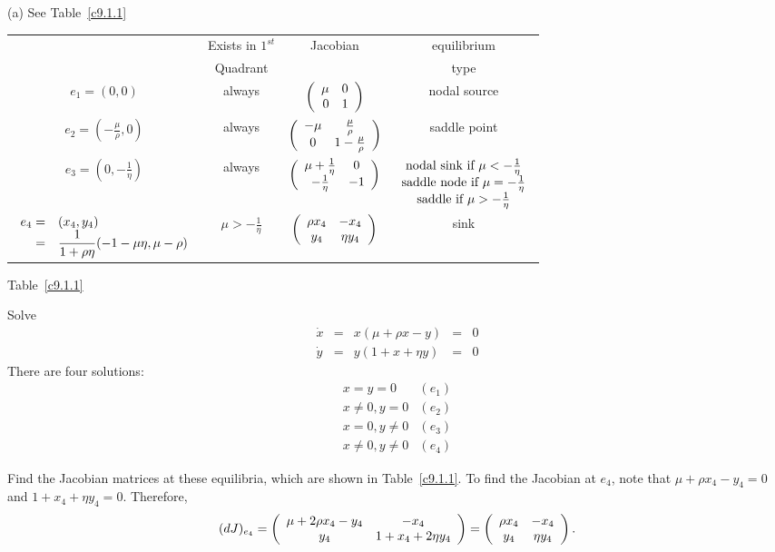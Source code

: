 \documentclass{ximera}
\begin{document}
(a) \ans See Table~\ref{c9.1.1}
\begin{table}[htb]
\begin{center}
\begin{tabular}{|c|c|c|c|}
\hline
& Exists in $1^{st}$ & Jacobian & equilibrium \\
& Quadrant & & type \\
\hline
$e_1 = (0,0)$ & always & $\left(\begin{array}{rr} \mu & 0\\ 0 &1\end{array}\right)$ & nodal source \\
\hline
$e_2 = \left(-\frac{\mu}{\rho},0\right)$ & always &
$\left(\begin{array}{cc} -\mu & \frac{\mu}{\rho}\\ 0 &1 - \frac{\mu}{\rho}\end{array}\right)$ &
saddle point \\
\hline
$e_3 = \left(0,-\frac{1}{\eta}\right)$ & always &
$\left(\begin{array}{cc} \mu + \frac{1}{\eta} & 0\\ -\frac{1}{\eta} &-1\end{array}\right)$ &
$\begin{array}{c} \hbox{nodal sink if } \mu < -\frac{1}{\eta} \\
\hbox{saddle node if } \mu = -\frac{1}{\eta} \\
\hbox{saddle if } \mu > -\frac{1}{\eta} \end{array}$ \\
\hline
$\begin{array}{rl} e_4 = & (x_4,y_4) \\
 = & \displaystyle\frac{1}{1 + \rho\eta}(-1 - \mu\eta, \mu - \rho) \end{array}$ 
& $\mu > -\frac{1}{\eta}$ &
$\left(\begin{array}{cc} \rho x_4 & -x_4\\ y_4 &\eta y_4\end{array}\right)$ & sink \\
\hline
\end{tabular}

\vspace{0.2in}
Table~\ref{c9.1.1}
\end{center}
\end{table}

\soln
Solve
\[
\begin{array}{rcccl}
\dot{x} & = & x(\mu + \rho x - y) & = & 0 \\
\dot{y} & = & y(1 + x + \eta y) & = & 0 \end{array}
\]
There are four solutions:
\[
\begin{array}{lr}
x = y = 0 & (e_1) \\
x \neq 0, y = 0 & (e_2) \\
x = 0, y \neq 0 & (e_3) \\
x \neq 0, y \neq 0 & (e_4) \end{array}
\]

Find the Jacobian matrices at these equilibria, which are shown in
Table~\ref{c9.1.1}.  To find the Jacobian at $e_4$, note that
$\mu + \rho x_4 - y_4 = 0$ and $1 + x_4 + \eta y_4 = 0$.  Therefore,
\[
(dJ)_{e_4} = \left(\begin{array}{cc} \mu + 2\rho x_4 - y_4 & -x_4\\ y_4 &1 + x_4 +
2\eta y_4\end{array}\right) = \left(\begin{array}{cc} \rho x_4 & -x_4\\ y_4 &\eta y_4\end{array}\right).
\]
\end{document}
